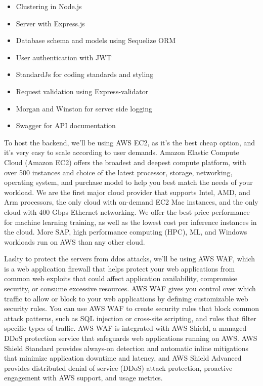 \begin{itemize}
  \item {Clustering in Node.js}
  \item {Server with Express.js}
  \item {Database schema and models using Sequelize ORM}
  \item {User authentication with JWT}
  \item {StandardJs for coding standards and styling}
  \item {Request validation using Express-validator}
  \item {Morgan and Winston for server side logging}
  \item {Swagger for API documentation}
\end{itemize}

To host the backend, we'll be using AWS EC2, as it's the best cheap option, and it's very easy to scale according to user demands. Amazon Elastic Compute Cloud (Amazon EC2) offers the broadest and deepest compute platform, with over 500 instances and choice of the latest processor, storage, networking, operating system, and purchase model to help you best match the needs of your workload. We are the first major cloud provider that supports Intel, AMD, and Arm processors, the only cloud with on-demand EC2 Mac instances, and the only cloud with 400 Gbps Ethernet networking. We offer the best price performance for machine learning training, as well as the lowest cost per inference instances in the cloud. More SAP, high performance computing (HPC), ML, and Windows workloads run on AWS than any other cloud.

Laslty to protect the servers from ddos attacks, we'll be using AWS WAF, which is a web application firewall that helps protect your web applications from common web exploits that could affect application availability, compromise security, or consume excessive resources. AWS WAF gives you control over which traffic to allow or block to your web applications by defining customizable web security rules. You can use AWS WAF to create security rules that block common attack patterns, such as SQL injection or cross-site scripting, and rules that filter specific types of traffic. AWS WAF is integrated with AWS Shield, a managed DDoS protection service that safeguards web applications running on AWS. AWS Shield Standard provides always-on detection and automatic inline mitigations that minimize application downtime and latency, and AWS Shield Advanced provides distributed denial of service (DDoS) attack protection, proactive engagement with AWS support, and usage metrics.

